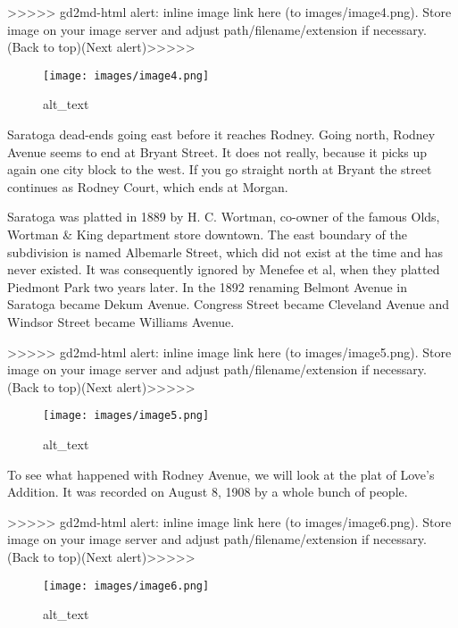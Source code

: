 \documentclass[
]{article}
\begin{document}
{\textgreater\textgreater\textgreater\textgreater\textgreater{}
gd2md-html alert: inline image link here (to images/image4.png). Store
image on your image server and adjust path/filename/extension if
necessary. }(Back to top)(Next
alert){\textgreater\textgreater\textgreater\textgreater\textgreater{} }

\begin{figure}
\centering
\texttt{[image: images/image4.png]}
\caption{alt\_text}
\end{figure}

Saratoga dead-ends going east before it reaches Rodney. Going north,
Rodney Avenue seems to end at Bryant Street. It does not really, because
it picks up again one city block to the west. If you go straight north
at Bryant the street continues as Rodney Court, which ends at Morgan.

Saratoga was platted in 1889 by H. C. Wortman, co-owner of the famous
Olds, Wortman \& King department store downtown. The east boundary of
the subdivision is named Albemarle Street, which did not exist at the
time and has never existed. It was consequently ignored by Menefee et
al, when they platted Piedmont Park two years later. In the 1892
renaming Belmont Avenue in Saratoga became Dekum Avenue. Congress Street
became Cleveland Avenue and Windsor Street became Williams Avenue.

{\textgreater\textgreater\textgreater\textgreater\textgreater{}
gd2md-html alert: inline image link here (to images/image5.png). Store
image on your image server and adjust path/filename/extension if
necessary. }(Back to top)(Next
alert){\textgreater\textgreater\textgreater\textgreater\textgreater{} }

\begin{figure}
\centering
\texttt{[image: images/image5.png]}
\caption{alt\_text}
\end{figure}

To see what happened with Rodney Avenue, we will look at the plat of
Love's Addition. It was recorded on August 8, 1908 by a whole bunch of
people.

{\textgreater\textgreater\textgreater\textgreater\textgreater{}
gd2md-html alert: inline image link here (to images/image6.png). Store
image on your image server and adjust path/filename/extension if
necessary. }(Back to top)(Next
alert){\textgreater\textgreater\textgreater\textgreater\textgreater{} }

\begin{figure}
\centering
\texttt{[image: images/image6.png]}
\caption{alt\_text}
\end{figure}
\end{document}
